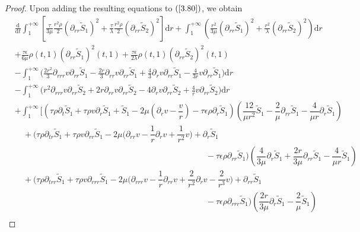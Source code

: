 \documentclass[10pt,reqno]{amsart}
\numberwithin{equation}{section}
\begin{document}
\begin{proof}
		Upon adding the resulting equations to \((\ref{3.80})\), we obtain 
			\begin{align}\label{64}
				&\frac{\mathrm{d}}{\mathrm{d} t}\int_{1}^{+\infty}\left[\frac{\tau}{3 \mu} \frac{r^2 \rho}{2}(\partial_{rr} \tilde{S}_1)^2+\frac{\tau }{\lambda} \frac{r^2 \rho}{2}(\partial_{rr} \tilde{S}_2)^2\right]\mathrm{d}r
				+\int_{1}^{+\infty}(\frac{r^2}{3 \mu}(\partial_{rr} \tilde{S}_1)^2+\frac{r^2}{\lambda}(\partial_{rr} \tilde{S}_2)^2)\mathrm{d}r
				\nonumber\\
				&+\frac{\tau\epsilon}{6 \mu}\rho(t,1)(\partial_{rr}\tilde{S}_1)^2(t,1) +\frac{\tau\epsilon}{2\lambda}\rho(t,1)(\partial_{rr}\tilde{S}_2)^2(t,1) \nonumber\\
				&-\int_{1}^{+\infty}\bigg(\frac{2r^2}{3}\partial_{rrr} v\partial_{rr} \tilde{S}_1- \frac{2r}{3}\partial_{rr} v\partial_{rr}\tilde{S}_1
				+\frac{4}{3} \partial_{r}v\partial_{rr} \tilde{S}_1-\frac{4}{3r}v\partial_{rr} \tilde{S}_1
				\bigg)\mathrm{d}r \nonumber\\
				&-\int_{1}^{+\infty}\bigg(r^2\partial_{rrr}v\partial_{rr} \tilde{S}_2 +2r\partial_{rr}v\partial_{rr} \tilde{S}_2
				-4\partial_{r}v\partial_{rr} \tilde{S}_2+\frac{4}{r}v\partial_{rr} \tilde{S}_2\bigg)\mathrm{d}r \nonumber
				\\
				&+\int_{1}^{+\infty}\bigg[\left(\tau \rho\partial_{t}\tilde{S}_1+\tau \rho v\partial_r\tilde{S}_1  +\tilde{S}_1-2\mu(\partial_r v- \dfrac{v}{r})-\tau\epsilon\rho\partial_{r}\tilde{S}_1\right)(\dfrac{12}{\mu r^2}\tilde{S}_1-\dfrac{2}{\mu}\partial_{rr}\tilde{S}_1-\dfrac{4}{\mu r}\partial_{r}\tilde{S}_1) \nonumber\\
				&\quad
				+\bigg(\tau \rho\partial_{tr}\tilde{S}_1+\tau \rho v \partial_{rr}\tilde{S}_1 
				-2\mu\big(\partial_{rr} v- \dfrac{1}{r}\partial_r v
				+\dfrac{1}{r^2} v \big)+\partial_r \tilde{S}_1 \nonumber \\
				&\qquad\qquad\qquad\qquad\qquad\qquad\qquad\qquad\qquad\qquad\qquad\quad-\tau\epsilon\rho\partial_{rr}\tilde{S}_1
				\bigg)(\dfrac{4}{3\mu}\partial_{r}\tilde{S}_1+\dfrac{2r}{3\mu}\partial_{rr}\tilde{S}_1 -\dfrac{4}{\mu r}\tilde{S}_1) \nonumber\\
				&\quad
				+\bigg(\tau \rho\partial_{trr}\tilde{S}_1+\tau \rho v \partial_{rrr}\tilde{S}_1 
				-2\mu\big(\partial_{rrr} v- \dfrac{1}{r}\partial_{rr} v
				+\dfrac{2}{r^2} \partial_{r}v-\dfrac{2}{r^3}v \big)+\partial_{rr} \tilde{S}_1 \nonumber \\ &\qquad\qquad\qquad\qquad\qquad\qquad\qquad\qquad\qquad\qquad\qquad\quad-\tau\epsilon\rho\partial_{rrr}\tilde{S}_1\bigg)(\dfrac{2r}{3\mu}\partial_{r}\tilde{S}_1 -\dfrac{2}{\mu}\tilde{S}_1) \nonumber\\

\end{align}
\end{proof}
\end{document}
